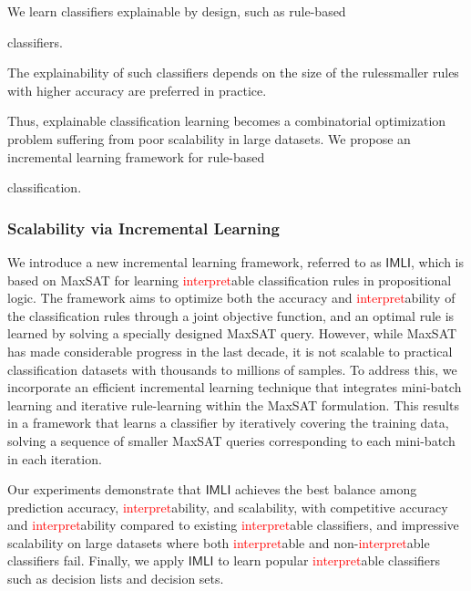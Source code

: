 \documentclass[10pt]{article}
\newcommand{\red}[1]{\textcolor{red}{#1}}
\newif\iflongproposal
\begin{document}
	We learn classifiers explainable by design, such as  rule-based 
	\iflongproposal
	classifiers. In rule-based classifiers, such as decision lists and decision sets, the decision boundary is explained using a set of rules relating input features to class prediction.
	\else
	classifiers.
	\fi
	The explainability of such classifiers depends on the size of the rules\textemdash smaller rules with higher accuracy are preferred in \iflongproposal
	practice, such as by practitioners in the medical domain.
	\else
	practice.
	\fi 
	Thus, explainable classification learning becomes a combinatorial optimization problem suffering from poor scalability in large datasets. We propose an incremental learning framework for rule-based 
	\iflongproposal
	classification by combining the progress in maximum satisfiability (MaxSAT) and mixed integer linear programming (MILP).
	\else
	classification.
	\fi
	
	\subsubsection*{Scalability via Incremental Learning}
	We introduce a new incremental learning framework, referred to as $\mathsf{IMLI}$, which is based on MaxSAT for learning \red{interpret}able classification rules in propositional logic. The framework aims to optimize both the accuracy and \red{interpret}ability of the classification rules through a joint objective function, and an optimal rule is learned by solving a specially designed MaxSAT query. However, while MaxSAT has made considerable progress in the last decade, it is not scalable to practical classification datasets with thousands to millions of samples. To address this, we incorporate an efficient incremental learning technique that integrates mini-batch learning and iterative rule-learning within the MaxSAT formulation. This results in a framework that learns a classifier by iteratively covering the training data, solving a sequence of smaller MaxSAT queries corresponding to each mini-batch in each iteration. 
	
	
	Our experiments demonstrate that $\mathsf{IMLI}$ achieves the best balance among prediction accuracy, \red{interpret}ability, and scalability, with competitive accuracy and \red{interpret}ability compared to existing \red{interpret}able classifiers, and impressive scalability on large datasets where both \red{interpret}able and non-\red{interpret}able classifiers fail. Finally, we apply $\mathsf{IMLI}$ to learn popular \red{interpret}able classifiers such as decision lists and decision sets.
	
\end{document}

